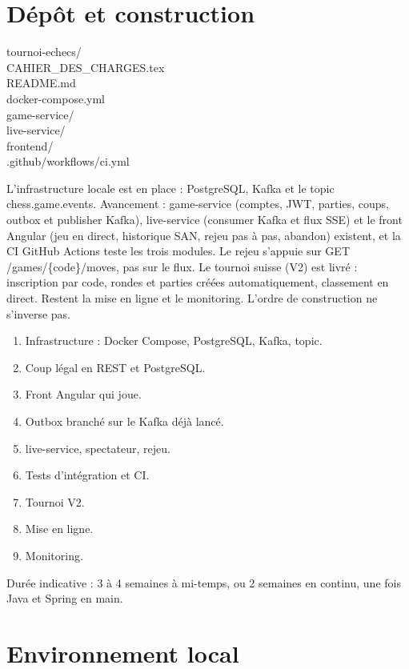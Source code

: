 \documentclass[11pt,a4paper]{article}
\newcommand{\panel}[2]{%
  \par\vspace{6pt}%
  {\setlength{\fboxsep}{9pt}%
   \noindent\colorbox{soft}{%
     \parbox{\dimexpr\linewidth-2\fboxsep\relax}{#1\small #2}%
   }}%
  \par\vspace{6pt}%
}
\newcommand{\softbox}[1]{\panel{\ttfamily}{#1}}
\newcommand{\field}[1]{{\ttfamily #1}}
\begin{document}
\section{Dépôt et construction}

\softbox{%
tournoi-echecs/\\
\quad CAHIER\_DES\_CHARGES.tex\\
\quad README.md\\
\quad docker-compose.yml\\
\quad game-service/\\
\quad live-service/\\
\quad frontend/\\
\quad .github/workflows/ci.yml%
}

L'infrastructure locale est en place : PostgreSQL, Kafka et le topic \field{chess.game.events}. Avancement : \field{game-service} (comptes, JWT, parties, coups, outbox et publisher Kafka), \field{live-service} (consumer Kafka et flux SSE) et le front Angular (jeu en direct, historique SAN, rejeu pas à pas, abandon) existent, et la CI GitHub Actions teste les trois modules. Le rejeu s'appuie sur \field{GET /games/\{code\}/moves}, pas sur le flux. Le tournoi suisse (V2) est livré : inscription par code, rondes et parties créées automatiquement, classement en direct. Restent la mise en ligne et le monitoring. L'ordre de construction ne s'inverse pas.

\begin{enumerate}
  \item Infrastructure : Docker Compose, PostgreSQL, Kafka, topic.
  \item Coup légal en REST et PostgreSQL.
  \item Front Angular qui joue.
  \item Outbox branché sur le Kafka déjà lancé.
  \item \field{live-service}, spectateur, rejeu.
  \item Tests d'intégration et CI.
  \item Tournoi V2.
  \item Mise en ligne.
  \item Monitoring.
\end{enumerate}

Durée indicative : 3 à 4 semaines à mi-temps, ou 2 semaines en continu, une fois Java et Spring en main.

\section{Environnement local}
\end{document}
